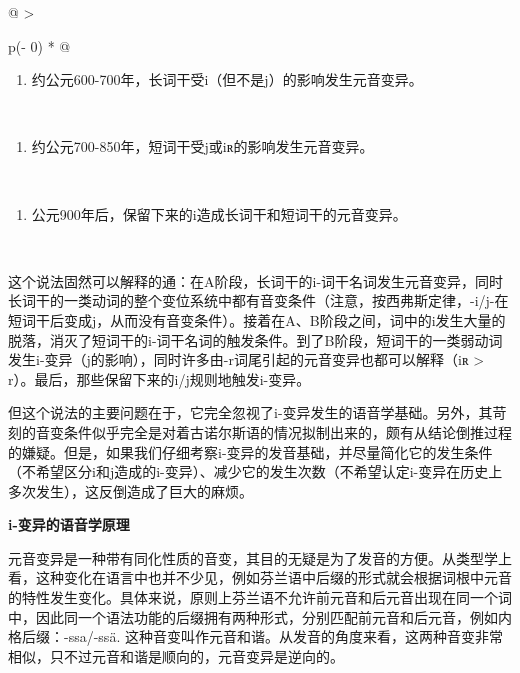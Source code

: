 {{\begin{longtable}[]{@{}
  >{\raggedright\arraybackslash}p{(\columnwidth - 0\tabcolsep) * }@{}}
\toprule\noalign{}
\begin{minipage}[b]{\linewidth}\raggedright
\begin{enumerate}
\def\labelenumi{\Alph{enumi}.}
\item
  约公元600-700年，长词干受i（但不是j）的影响发生元音变异。
\end{enumerate}
\end{minipage} \\
\midrule\noalign{}
\endhead
\bottomrule\noalign{}
\endlastfoot
\begin{minipage}[t]{\linewidth}\raggedright
\begin{enumerate}
\def\labelenumi{\Alph{enumi}.}
\setcounter{enumi}{1}
\item
  约公元700-850年，短词干受j或iʀ的影响发生元音变异。
\end{enumerate}
\end{minipage} \\
\begin{minipage}[t]{\linewidth}\raggedright
\begin{enumerate}
\def\labelenumi{\Alph{enumi}.}
\setcounter{enumi}{2}
\item
  公元900年后，保留下来的i造成长词干和短词干的元音变异。
\end{enumerate}
\end{minipage} \\
\end{longtable}

这个说法固然可以解释的通：在A阶段，长词干的i-词干名词发生元音变异，同时长词干的一类动词的整个变位系统中都有音变条件（注意，按西弗斯定律，-i/j-在短词干后变成j，从而没有音变条件）。接着在A、B阶段之间，词中的i发生大量的脱落，消灭了短词干的i-词干名词的触发条件。到了B阶段，短词干的一类弱动词发生i-变异（j的影响），同时许多由-r词尾引起的元音变异也都可以解释（iʀ
\textgreater{} r）。最后，那些保留下来的i/j规则地触发i-变异。

但这个说法的主要问题在于，它完全忽视了i-变异发生的语音学基础。另外，其苛刻的音变条件似乎完全是对着古诺尔斯语的情况拟制出来的，颇有从结论倒推过程的嫌疑。但是，如果我们仔细考察i-变异的发音基础，并尽量简化它的发生条件（不希望区分i和j造成的i-变异）、减少它的发生次数（不希望认定i-变异在历史上多次发生），这反倒造成了巨大的麻烦。

\textbf{i-变异的语音学原理}

元音变异是一种带有同化性质的音变，其目的无疑是为了发音的方便。从类型学上看，这种变化在语言中也并不少见，例如芬兰语中后缀的形式就会根据词根中元音的特性发生变化。具体来说，原则上芬兰语不允许前元音和后元音出现在同一个词中，因此同一个语法功能的后缀拥有两种形式，分别匹配前元音和后元音，例如内格后缀：-ssa/-ssä.
这种音变叫作元音和谐。从发音的角度来看，这两种音变非常相似，只不过元音和谐是顺向的，元音变异是逆向的。

}}
